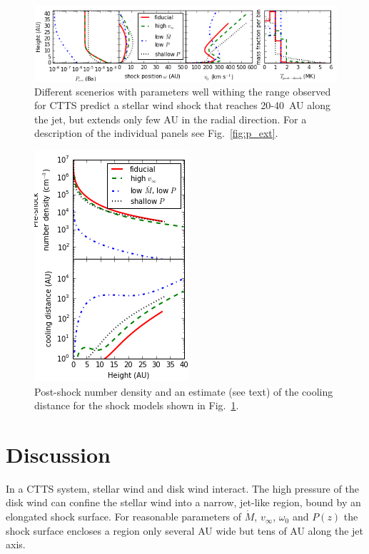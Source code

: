 \documentclass[manuscript]{aastex}
\begin{document}
\begin{figure}[h!]
\begin{center}
\includegraphics[width=1\columnwidth]{figures/result/result.png}
\caption{\label{fig:result}
Different scenerios with parameters well withing the range observed for CTTS predict a stellar wind shock that reaches 20-40~AU along the jet, but extends only few AU in the radial direction. For a description of the individual panels see Fig.~\ref{fig:p_ext}.}
\end{center}
\end{figure}

\begin{figure}[h!]
\begin{center}
\includegraphics[width=0.42\columnwidth]{figures/rhocool/rhocool.png}
\caption{\label{fig:rhocool}
Post-shock number density and an estimate (see text) of the cooling distance for the shock models shown in Fig.~\ref{fig:result}.}
\end{center}
\end{figure}

\section{Discussion}
\label{sect:discussion}
In a CTTS system, stellar wind and disk wind interact. The high pressure of the disk wind can confine the stellar wind into a narrow, jet-like region, bound by an elongated shock surface. For reasonable parameters of $\dot M$, $v_\infty$, $\omega_0$ and $P(z)$ the shock surface encloses a region only several AU wide but tens of AU along the jet axis. 
 
\end{document}
